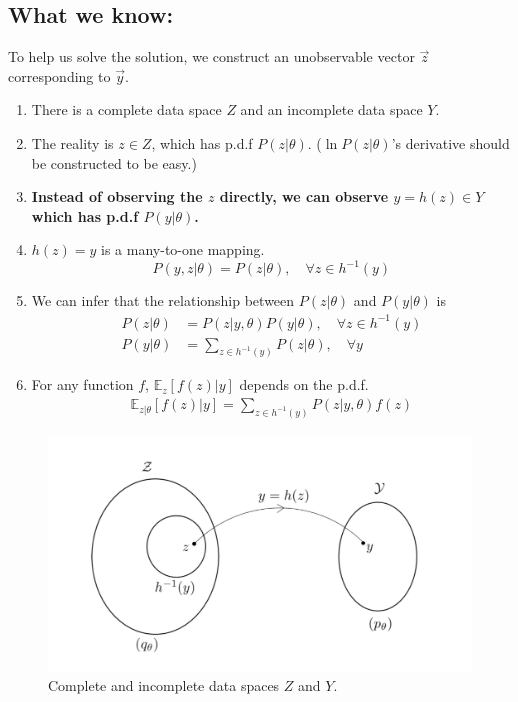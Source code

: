 \documentclass[11pt]{elegantbook}
\begin{document}
\subsection*{What we know:}
To help us solve the solution, we construct an unobservable vector $\vec{z}$ corresponding to $\vec{y}$.
\begin{enumerate}
    \item There is a complete data space $Z$ and an incomplete data space $Y$.
    \item The reality is $z\in Z$, which has p.d.f $P(z|\theta)$. ($\ln P(z|\theta)$'s derivative should be constructed to be easy.)
    \item \textbf{Instead of observing the $z$ directly, we can observe $y=h(z)\in Y$ which has p.d.f $P(y|\theta)$.}
    \item $h(z)=y$ is a many-to-one mapping. $$P(y,z|\theta)=P(z|\theta),\quad \forall z\in h^{-1}(y)$$
    \item We can infer that the relationship between $P(z|\theta)$ and $P(y|\theta)$ is
    \begin{equation}
        \begin{aligned}
            P(z|\theta)&=P(z|y,\theta)P(y|\theta),\quad \forall z\in h^{-1}(y)\\
            P(y|\theta)&=\sum_{z\in h^{-1}(y)}P(z|\theta),\quad \forall y
        \end{aligned}
        \nonumber
    \end{equation}
    \item For any function $f$, $\mathbb{E}_z[f(z)|y]$ depends on the p.d.f.
    \begin{equation}
        \begin{aligned}
            \mathbb{E}_{z|\theta}[f(z)|y]=\sum_{z\in h^{-1}(y)}P(z|y,\theta)f(z)
        \end{aligned}
        \nonumber
    \end{equation}
\end{enumerate}
\begin{center}\begin{figure}[htbp]
    \centering
    \includegraphics[scale=0.2]{EM1.png}
    \caption{Complete and incomplete data spaces $Z$ and $Y$.}
    \label{}
\end{figure}\end{center}
\end{document}
